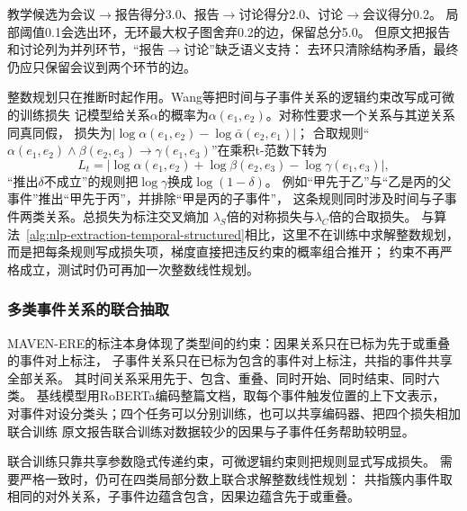 教学候选为会议$\to$报告得分3.0、报告$\to$讨论得分2.0、讨论$\to$会议得分0.2。
局部阈值0.1会选出环，无环最大权子图舍弃0.2的边，保留总分5.0。
但原文把报告和讨论列为并列环节，“报告$\to$讨论”缺乏语义支持：
去环只清除结构矛盾，最终仍应只保留会议到两个环节的边。

整数规划只在推断时起作用。Wang等把时间与子事件关系的逻辑约束改写成可微的训练损失
记模型给关系$\alpha$的概率为$\alpha(e_1,e_2)$。对称性要求一个关系与其逆关系同真同假，
损失为$|\log\alpha(e_1,e_2)-\log\bar{\alpha}(e_2,e_1)|$；
合取规则“$\alpha(e_1,e_2)\wedge\beta(e_2,e_3)\to\gamma(e_1,e_3)$”在乘积t-范数下转为
\begin{equation}
  L_{t}=\bigl|\log\alpha(e_1,e_2)+\log\beta(e_2,e_3)-\log\gamma(e_1,e_3)\bigr|,
  \label{eq:nlp-extraction-transitivity-loss}
\end{equation}
“推出$\delta$不成立”的规则把$\log\gamma$换成$\log(1-\delta)$。
例如“甲先于乙”与“乙是丙的父事件”推出“甲先于丙”，并排除“甲是丙的子事件”，
这条规则同时涉及时间与子事件两类关系。总损失为标注交叉熵加
$\lambda_S$倍的对称损失与$\lambda_C$倍的合取损失。
与算法~\ref{alg:nlp-extraction-temporal-structured}相比，这里不在训练中求解整数规划，
而是把每条规则写成损失项，梯度直接把违反约束的概率组合推开；
约束不再严格成立，测试时仍可再加一次整数线性规划。

\subsubsection{多类事件关系的联合抽取}
\label{sec:nlp-extraction-joint-event-relations}

MAVEN-ERE的标注本身体现了类型间的约束：因果关系只在已标为先于或重叠的事件对上标注，
子事件关系只在已标为包含的事件对上标注，共指的事件共享全部关系。
其时间关系采用先于、包含、重叠、同时开始、同时结束、同时六类。
基线模型用RoBERTa编码整篇文档，取每个事件触发位置的上下文表示，
对事件对设分类头；四个任务可以分别训练，也可以共享编码器、把四个损失相加联合训练
原文报告联合训练对数据较少的因果与子事件任务帮助较明显。

联合训练只靠共享参数隐式传递约束，可微逻辑约束则把规则显式写成损失。
需要严格一致时，仍可在四类局部分数上联合求解整数线性规划：
共指簇内事件取相同的对外关系，子事件边蕴含包含，因果边蕴含先于或重叠。

